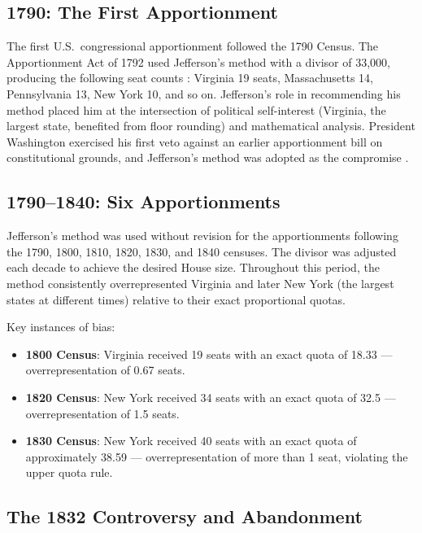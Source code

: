 \label{sec:history}

\subsection{1790: The First Apportionment}

The first U.S.\ congressional apportionment followed the 1790 Census.
The Apportionment Act of 1792 used Jefferson's method with a divisor
of 33{,}000, producing the following seat counts
\citep{schmeckebier1941congressional}:
Virginia 19 seats, Massachusetts 14, Pennsylvania 13, New York 10,
and so on.
Jefferson's role in recommending his method placed him at the intersection
of political self-interest (Virginia, the largest state, benefited from
floor rounding) and mathematical analysis.
President Washington exercised his first veto against an earlier
apportionment bill on constitutional grounds, and Jefferson's method
was adopted as the compromise \citep{balinski1982fair}.

\subsection{1790--1840: Six Apportionments}

Jefferson's method was used without revision for the apportionments
following the 1790, 1800, 1810, 1820, 1830, and 1840 censuses.
The divisor was adjusted each decade to achieve the desired House size.
Throughout this period, the method consistently overrepresented
Virginia and later New York (the largest states at different times)
relative to their exact proportional quotas.

Key instances of bias:
\begin{itemize}
  \item \textbf{1800 Census}: Virginia received 19 seats with an
    exact quota of 18.33 --- overrepresentation of 0.67 seats.
  \item \textbf{1820 Census}: New York received 34 seats with an
    exact quota of 32.5 --- overrepresentation of 1.5 seats.
  \item \textbf{1830 Census}: New York received 40 seats with an
    exact quota of approximately 38.59 --- overrepresentation of
    more than 1 seat, violating the upper quota rule.
\end{itemize}

\subsection{The 1832 Controversy and Abandonment}

